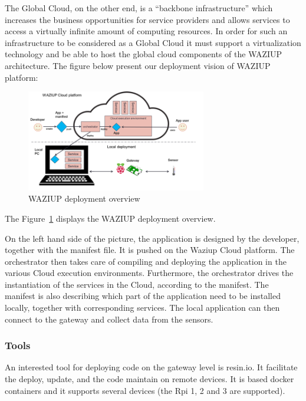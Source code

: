 The Global Cloud, on the other end, is a “backbone infrastructure” which increases the business opportunities for service providers and allows services to access a virtually infinite amount of computing resources. 
In order for such an infrastructure to be considered as a Global Cloud it must support a virtualization technology and be able to host the global cloud components of the WAZIUP architecture.
The figure below present our deployment vision of WAZIUP platform:

\begin{figure}[h!]
\centering
\includegraphics[width=0.7\textwidth]{figs/deploy.png}
\caption{WAZIUP deployment overview}
\label{fig:func}
\end{figure}

The Figure~\ref{fig:func} displays the WAZIUP deployment overview.

On the left hand side of the picture, the application is designed by the developer, together with the manifest file. 
It is pushed on the Waziup Cloud platform. The orchestrator then takes care of compiling and deploying the application in the various Cloud execution environments. 
Furthermore, the orchestrator drives the instantiation of the services in the Cloud, according to the manifest. 
The manifest is also describing which part of the application need to be installed locally, together with corresponding services. 
The local application can then connect to the gateway and collect data from the sensors.

\subsubsection{Tools}
An interested tool for deploying code on the gateway level is resin.io.
It facilitate the deploy, update, and the code maintain on remote devices. 
It is based docker containers and it supports several devices (the Rpi 1, 2 and 3 are supported).


